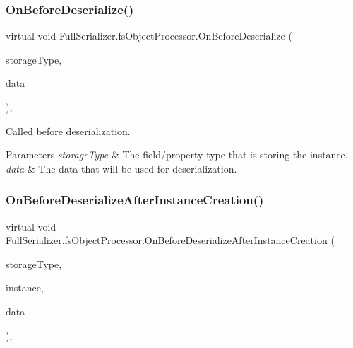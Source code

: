 \subsubsection{\texorpdfstring{On\+Before\+Deserialize()}{OnBeforeDeserialize()}}
{\footnotesize\ttfamily virtual void Full\+Serializer.\+fs\+Object\+Processor.\+On\+Before\+Deserialize (\begin{DoxyParamCaption}\item[{Type}]{storage\+Type,  }\item[{ref \hyperlink{class_full_serializer_1_1fs_data}{fs\+Data}}]{data }\end{DoxyParamCaption})\hspace{0.3cm}{\ttfamily [inline]}, {\ttfamily [virtual]}}



Called before deserialization. 


\begin{DoxyParams}{Parameters}
{\em storage\+Type} & The field/property type that is storing the instance.\\
\hline
{\em data} & The data that will be used for deserialization.\\
\hline
\end{DoxyParams}
\mbox{\label{class_full_serializer_1_1fs_object_processor_a99e0c1a7d896539470bbe7f43565a5a3}} 
\subsubsection{\texorpdfstring{On\+Before\+Deserialize\+After\+Instance\+Creation()}{OnBeforeDeserializeAfterInstanceCreation()}}
{\footnotesize\ttfamily virtual void Full\+Serializer.\+fs\+Object\+Processor.\+On\+Before\+Deserialize\+After\+Instance\+Creation (\begin{DoxyParamCaption}\item[{Type}]{storage\+Type,  }\item[{object}]{instance,  }\item[{ref \hyperlink{class_full_serializer_1_1fs_data}{fs\+Data}}]{data }\end{DoxyParamCaption})\hspace{0.3cm}{\ttfamily [inline]}, {\ttfamily [virtual]}}



